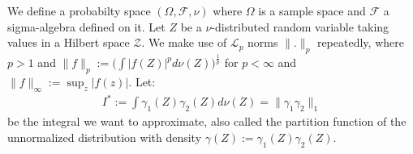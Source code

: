 \documentclass[reqno,oneside,letterpaper,10pt]{article}
\newcommand{\Zspace}{\mathcal{Z}}
\newcommand{\f}{f}
\newcommand{\red}[1]{{\color{red}#1}}
\newcommand{\Expectation}[2]{\int{#2}d\nu(\Z)}
\def\Z{Z}
\begin{document}
We define a probabilty space $(\Omega,\mathcal{F}, \nu)$ where $\Omega$ 
is a sample space and $\mathcal{F}$ a sigma-algebra defined on it.
Let $\Z$ be a $\nu$-distributed random variable taking values in a Hilbert space $\Zspace$.
We make use of $\mathcal{L}_p$ norms $\|.\|_p$ repeatedly, where $p>1$ and
$\|\f\|_p:=\bigl(\Expectation{\nu}{|f(\Z)|^p}\bigr)^{\frac 1p}$ for $p<\infty$ and $\|\f\|_\infty:=\sup_z |f(z)|$.
Let: %
\begin{eqnarray}
I^*:=\Expectation{}{\gamma_1(\Z)\gamma_2(\Z)}=\|\gamma_1\gamma_2\|_1
\end{eqnarray}
be the integral we want to approximate, also 
called the partition function of the unnormalized distribution with density $\gamma(\Z) :=\gamma_1(\Z)\gamma_2(\Z)$.

\newcommand{\balpha}{{\bm{\alpha}}}
\end{document}
